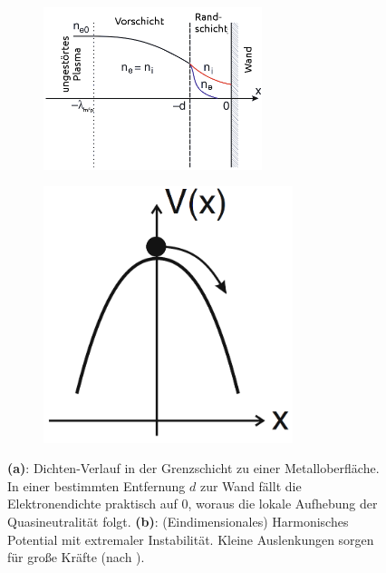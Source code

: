\documentclass[numbers=noenddot,a4paper]{scrartcl}
\newcommand{\fett}[1]{\textbf{#1}}
\begin{document}
				\begin{figure}
					\centering
					\begin{subfigure}[b]{0.6\textwidth}
						\centering
						\includegraphics[width=0.7\textwidth,height=0.5\textwidth]{figs/randschichtpiel.png}
						\caption{}
						\label{img:dichterand}
					\end{subfigure}
					\begin{subfigure}[b]{0.375\textwidth}
						\centering
						\includegraphics[width=0.8\textwidth,height=0.8\textwidth]{figs/parabelpiel.png}
						\caption{}
						\label{img:parab}
					\end{subfigure}
					\caption{\fett{(a)}: Dichten-Verlauf in der Grenzschicht zu einer Metalloberfläche. In einer bestimmten Entfernung $d$ zur Wand fällt die Elektronendichte praktisch auf 0, woraus die lokale Aufhebung der Quasineutralität folgt. \fett{(b)}: (Eindimensionales) Harmonisches Potential mit extremaler Instabilität. Kleine Auslenkungen sorgen für große Kräfte (nach \cite{Piel10}).}
				\end{figure}
\end{document}
